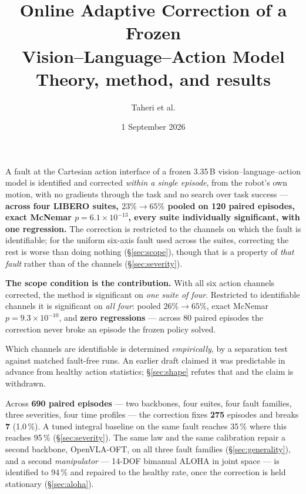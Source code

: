 \documentclass[11pt,a4paper]{article}
\title{\textbf{Online Adaptive Correction of a Frozen\\Vision--Language--Action Model}\\[0.4em]
\large Theory, method, and results}
\author{Taheri et al.}
\date{1 September 2026}
\begin{document}
\maketitle
\thispagestyle{fancy}

\begin{tcolorbox}[colback=blue!4,colframe=blue!45!black,title=\textbf{Result in one line}]
A fault at the Cartesian action interface of a frozen 3.35\,B vision--language--action model is
identified and corrected \emph{within a single episode}, from the robot's own
motion, with no gradients through the task and no search over task success ---
\textbf{across four LIBERO suites, $23\% \rightarrow 65\%$ pooled on 120 paired
episodes, exact McNemar $p = 6.1\times 10^{-13}$, every suite individually significant,
with one regression.}
The correction is restricted to the channels on which the fault is identifiable;
for the uniform six-axis fault used across the suites, correcting the rest is
worse than doing nothing (\S\ref{sec:scope}), though that is a property of
\emph{that fault} rather than of the channels (\S\ref{sec:severity}).
\end{tcolorbox}

\begin{tcolorbox}[colback=gray!6,colframe=gray!55!black]
\textbf{The scope condition is the contribution.} With all six action channels
corrected, the method is significant on \emph{one suite of four}. Restricted to
identifiable channels it is significant on \emph{all four}: pooled $26\% \to 65\%$,
exact McNemar $p = 9.3\times 10^{-10}$, and \textbf{zero regressions} --- across 80
paired episodes the correction never broke an episode the frozen policy solved.

Which channels are identifiable is determined \emph{empirically}, by a separation
test against matched fault-free runs. An earlier draft claimed it was predictable
in advance from healthy action statistics; \S\ref{sec:shape} refutes that and the
claim is withdrawn.

\vspace{0.3em}
Across \textbf{690 paired episodes} --- two backbones, four suites, four fault
families, three severities, four time profiles --- the correction fixes \textbf{275}
episodes and breaks \textbf{7} (1.0\,\%). A tuned integral baseline on the same fault reaches
35\,\% where this reaches 95\,\% (\S\ref{sec:severity}). The same law and the same
calibration repair a second backbone, OpenVLA-OFT, on all three fault families
(\S\ref{sec:generality}), and a second \emph{manipulator} --- 14-DOF bimanual ALOHA in
joint space --- is identified to 94\,\% and repaired to the healthy rate, once the
correction is held stationary (\S\ref{sec:aloha}).
\end{tcolorbox}
\end{document}
